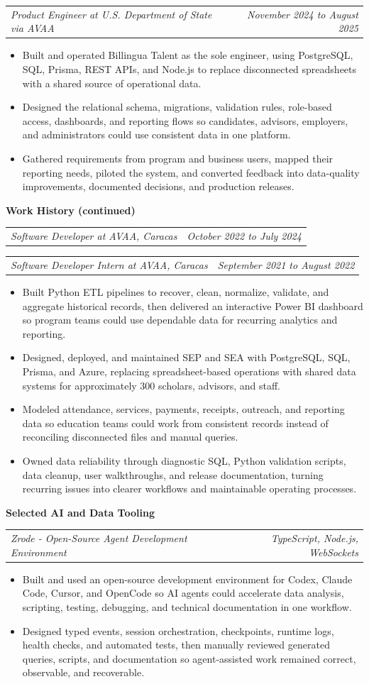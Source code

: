 \documentclass[10pt,letterpaper]{article}
\makeatletter
\newcommand{\bodyfont}{\fontsize{10.5}{15.75}\selectfont}
\newcommand{\sectiontitle}[1]{%
  \vspace{4pt}
  {\bodyfont\textbf{#1}}\par
  \nopagebreak[4]
  \vspace{2pt}
}
\newcommand{\roleline}[2]{%
  \begin{tabularx}{\textwidth}{@{}Xr@{}}
    \bodyfont\textit{#1} & \bodyfont\textit{#2}
  \end{tabularx}
  \nopagebreak[4]
  \vspace{1pt}
}
\makeatother
\begin{document}
\vspace{3pt}
\roleline{Product Engineer at U.S. Department of State via AVAA}{November 2024 to August 2025}
\begin{itemize}
  \item Built and operated Billingua Talent as the sole engineer, using PostgreSQL, SQL, Prisma, REST APIs, and Node.js to replace disconnected spreadsheets with a shared source of operational data.
  \item Designed the relational schema, migrations, validation rules, role-based access, dashboards, and reporting flows so candidates, advisors, employers, and administrators could use consistent data in one platform.
  \item Gathered requirements from program and business users, mapped their reporting needs, piloted the system, and converted feedback into data-quality improvements, documented decisions, and production releases.
\end{itemize}

\newpage
\sectiontitle{Work History (continued)}

\roleline{Software Developer at AVAA, Caracas}{October 2022 to July 2024}
\roleline{Software Developer Intern at AVAA, Caracas}{September 2021 to August 2022}
\begin{itemize}
  \item Built Python ETL pipelines to recover, clean, normalize, validate, and aggregate historical records, then delivered an interactive Power BI dashboard so program teams could use dependable data for recurring analytics and reporting.
  \item Designed, deployed, and maintained SEP and SEA with PostgreSQL, SQL, Prisma, and Azure, replacing spreadsheet-based operations with shared data systems for approximately 300 scholars, advisors, and staff.
  \item Modeled attendance, services, payments, receipts, outreach, and reporting data so education teams could work from consistent records instead of reconciling disconnected files and manual queries.
  \item Owned data reliability through diagnostic SQL, Python validation scripts, data cleanup, user walkthroughs, and release documentation, turning recurring issues into clearer workflows and maintainable operating processes.
\end{itemize}

\sectiontitle{Selected AI and Data Tooling}

\roleline{Zrode - Open-Source Agent Development Environment}{TypeScript, Node.js, WebSockets}
\begin{itemize}
  \item Built and used an open-source development environment for Codex, Claude Code, Cursor, and OpenCode so AI agents could accelerate data analysis, scripting, testing, debugging, and technical documentation in one workflow.
  \item Designed typed events, session orchestration, checkpoints, runtime logs, health checks, and automated tests, then manually reviewed generated queries, scripts, and documentation so agent-assisted work remained correct, observable, and recoverable.
\end{itemize}
\end{document}
